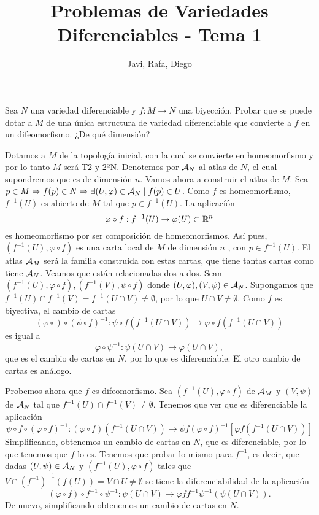 \documentclass[twoside]{article}
\begin{document}
\title{Problemas de Variedades Diferenciables - Tema 1}
\author{Javi, Rafa, Diego}
\maketitle



\begin{ejercicio}{5}
Sea $N$ una variedad diferenciable y $f : M \to N$ una biyección.
Probar que se puede dotar a $M$ de una única estructura de variedad diferenciable
que convierte a $f$ en un difeomorfismo. ¿De qué dimensión?
\end{ejercicio}
\begin{solucion}
Dotamos a $M$ de la topología inicial, con la cual se convierte en homeomorfismo y por lo tanto $M$ será T2 y 2ºN. Denotemos por $\mathcal{A}_N$ al atlas de $N$, el cual supondremos que es de dimensión $n$. Vamos ahora a construir el atlas de $M$. Sea $p\in M\Rightarrow f(p)\in N\Rightarrow\exists (U,\varphi)\in\mathcal{A}_N\mid f(p)\in U$. Como $f$ es homeomorfismo, $f^{-1}(U)$ es abierto de $M$ tal que $p\in f^{-1}(U)$. La aplicacíón 
$$\varphi\circ f:f^{-1}(U)\to\varphi(U)\subset\mathbb{R}^n$$
es homeomorfismo por ser composición de homeomorfismos. Así pues, $(f^{-1}(U),\varphi\circ f)$ es una carta local de $M$ de dimensión $n$ , con $p\in f^{-1}(U)$. El atlas $\mathcal{A}_M$ será la familia construida con estas cartas, que tiene tantas cartas como tiene $\mathcal{A}_N$. Veamos que están relacionadas dos a dos. Sean $(f^{-1}(U),\varphi\circ f),(f^{-1}(V),\psi\circ f)$ donde $(U,\varphi),(V,\psi)\in\mathcal{A}_N$. Supongamos que $f^{-1}(U)\cap f^{-1}(V)=f^{-1}(U\cap V)\neq\emptyset$, por lo que $U\cap V\neq\emptyset$. Como $f$ es biyectiva, el cambio de cartas
$$(\varphi\circ )\circ(\psi\circ f)^{-1}:\psi\circ f(f^{-1}(U\cap V))\to\varphi\circ f(f^{-1}(U\cap V))$$
es igual a
$$\varphi\circ\psi^{-1}:\psi(U\cap V)\to\varphi(U\cap V),$$
que es el cambio de cartas en $N$, por lo que es diferenciable. El otro cambio de cartas es análogo. 

Probemos ahora que $f$ es difeomorfismo. Sea $(f^{-1}(U),\varphi\circ f)$ de $\mathcal{A}_M$ y $(V,\psi)$ de $\mathcal{A}_N$ tal que $f^{-1}(U)\cap f^{-1}(V)\neq\emptyset$. Tenemos que ver que es diferenciable la aplicación
$$\psi\circ f\circ(\varphi\circ f)^{-1}:(\varphi\circ f)(f^{-1}(U\cap V))\to\psi f(\varphi\circ f)^{-1}[\varphi f(f^{-1}(U\cap V))]$$
Simplificando, obtenemos un cambio de cartas en $N$, que es diferenciable, por lo que tenemos que $f$ lo es. Tenemos que probar lo mismo para $f^{-1}$, es decir, que dadas $(U,\psi)\in\mathcal{A}_N$ y $(f^{-1}(U),\varphi\circ f)$ tales que $V\cap (f^{-1})^{-1}(f(U))=V\cap U\neq\emptyset$ se tiene la diferenciabilidad de la aplicación
$$(\varphi\circ f)\circ f^{-1}\circ\psi^{-1}:\psi(U\cap V)\to\varphi ff^{-1}\psi^{-1}(\psi(U\cap V)).$$
De nuevo, simplificando obtenemos un cambio de cartas en $N$. 


\end{solucion}
\end{document}
